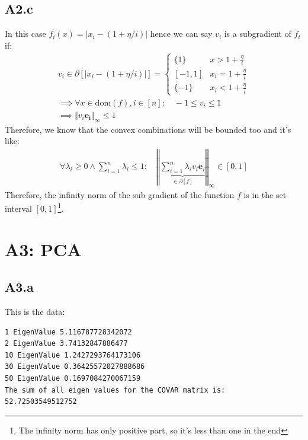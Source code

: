 \documentclass[]{article}
\begin{document}
    \subsection*{A2.c}
        In this case $f_i(x) = |x_i - (1 + \eta/i)|$ hence we can say $v_i$ is a subgradient of $f_i$ if:
        \begin{align*}\tag{A2.c.1}\label{eqn:A2.c.1}
            v_i \in \partial[|x_i - (1 + \eta/i)|] = \begin{cases}
                \{1\} & x > 1 + \frac{\eta}{i} 
                \\
                [-1, 1] & x_i = 1 + \frac{\eta}{i}
                \\
                \{-1\} & x_i < 1 + \frac{\eta}{i}
            \end{cases}
            \\
            \implies \forall x\in \text{dom}(f), i\in [n]: \quad
            -1 \le v_i \le 1
            \\
            \implies \Vert v_i\mathbf{e_i}\Vert_\infty \le 1
        \end{align*}
        Therefore, we know that the convex combinations will be bounded too and it's like: 
        \begin{align*}\tag{A2.c.2}\label{eqn:A2.c.2}
            \forall \lambda_i \ge 0 \wedge \sum_{i = 1}^{n}\lambda_i \le 1:
            \quad 
            \left\Vert 
                \underbrace{\sum_{i = 1}^{n}\lambda_iv_i\mathbf{e}_i}_{\in \partial[f]} 
            \right\Vert_\infty \in [0, 1]
        \end{align*}
        Therefore, the infinity norm of the sub gradient of the function $f$ is in the set interval $[0, 1]$\footnote{The infinity norm has only positive part, so it's less than one in the end}. 
            
\section*{A3: PCA}
    \subsection*{A3.a}
        This is the data: 
        \begin{lstlisting}
1 EigenValue 5.116787728342072
2 EigenValue 3.74132847886477
10 EigenValue 1.2427293764173106
30 EigenValue 0.36425572027888686
50 EigenValue 0.1697084270067159
The sum of all eigen values for the COVAR matrix is:
52.72503549512752            
        \end{lstlisting}
        
\end{document}
